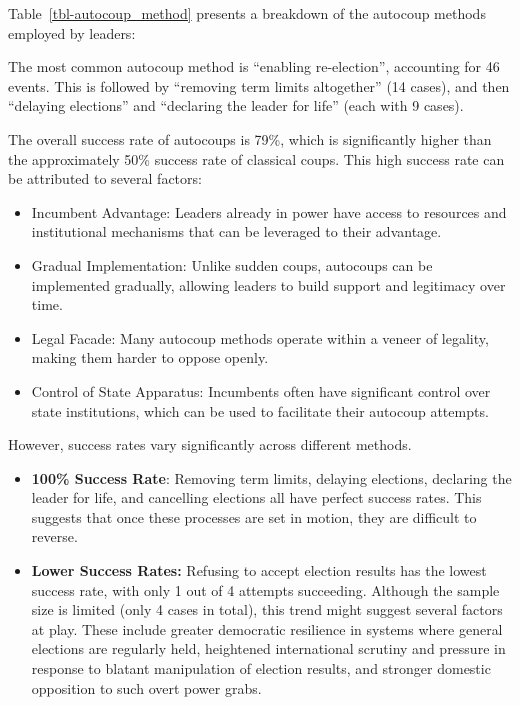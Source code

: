 \documentclass[
  12pt,
]{report}
\begin{document}
\endgroup

Table~\ref{tbl-autocoup_method} presents a breakdown of the autocoup
methods employed by leaders:

The most common autocoup method is ``enabling re-election'', accounting
for 46 events. This is followed by ``removing term limits altogether''
(14 cases), and then ``delaying elections'' and ``declaring the leader
for life'' (each with 9 cases).

The overall success rate of autocoups is 79\%, which is significantly
higher than the approximately 50\% success rate of classical coups. This
high success rate can be attributed to several factors:

\begin{itemize}
\item
  Incumbent Advantage: Leaders already in power have access to resources
  and institutional mechanisms that can be leveraged to their advantage.
\item
  Gradual Implementation: Unlike sudden coups, autocoups can be
  implemented gradually, allowing leaders to build support and
  legitimacy over time.
\item
  Legal Facade: Many autocoup methods operate within a veneer of
  legality, making them harder to oppose openly.
\item
  Control of State Apparatus: Incumbents often have significant control
  over state institutions, which can be used to facilitate their
  autocoup attempts.
\end{itemize}

However, success rates vary significantly across different methods.

\begin{itemize}
\item
  \textbf{100\% Success Rate}: Removing term limits, delaying elections,
  declaring the leader for life, and cancelling elections all have
  perfect success rates. This suggests that once these processes are set
  in motion, they are difficult to reverse.
\item
  \textbf{Lower Success Rates:} Refusing to accept election results has
  the lowest success rate, with only 1 out of 4 attempts succeeding.
  Although the sample size is limited (only 4 cases in total), this
  trend might suggest several factors at play. These include greater
  democratic resilience in systems where general elections are regularly
  held, heightened international scrutiny and pressure in response to
  blatant manipulation of election results, and stronger domestic
  opposition to such overt power grabs.
\end{itemize}
\end{document}
